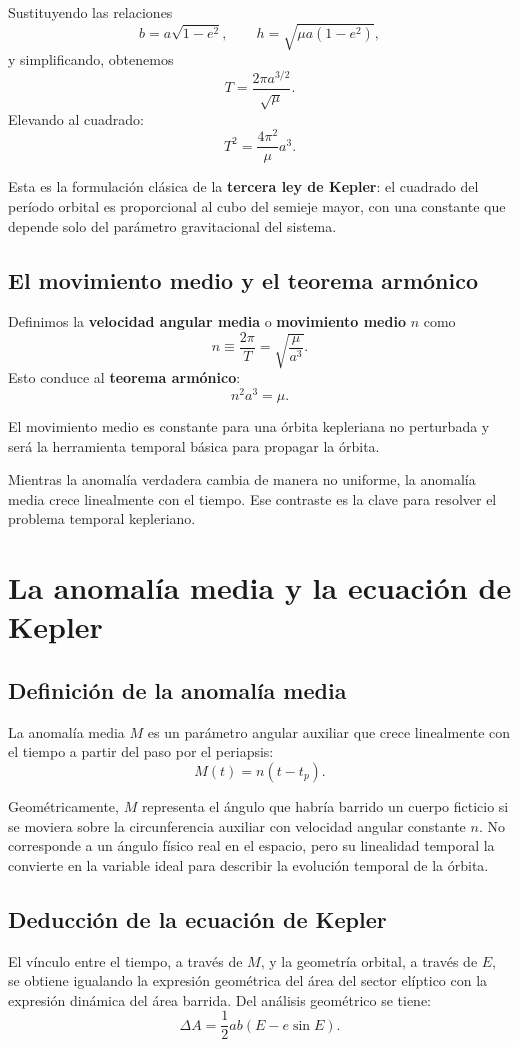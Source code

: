 Sustituyendo las relaciones
\[
 b = a\sqrt{1-e^2},
 \qquad
 h = \sqrt{\mu a(1-e^2)},
\]
y simplificando, obtenemos
\[
 T = \frac{2\pi a^{3/2}}{\sqrt{\mu}}.
\]
Elevando al cuadrado:
\[
 T^2 = \frac{4\pi^2}{\mu}a^3.
\]

Esta es la formulación clásica de la \textbf{tercera ley de Kepler}: el cuadrado del período orbital es proporcional al cubo del semieje mayor, con una constante que depende solo del parámetro gravitacional del sistema.

\subsection{El movimiento medio y el teorema armónico}
Definimos la \textbf{velocidad angular media} o \textbf{movimiento medio} \(n\) como
\[
 n \equiv \frac{2\pi}{T} = \sqrt{\frac{\mu}{a^3}}.
\]
Esto conduce al \textbf{teorema armónico}:
\[
 n^2 a^3 = \mu.
\]

El movimiento medio es constante para una órbita kepleriana no perturbada y será la herramienta temporal básica para propagar la órbita.

\begin{importante}
Mientras la anomalía verdadera cambia de manera no uniforme, la anomalía media crece linealmente con el tiempo. Ese contraste es la clave para resolver el problema temporal kepleriano.
\end{importante}

\section{La anomalía media y la ecuación de Kepler}
\subsection{Definición de la anomalía media}
La anomalía media \(M\) es un parámetro angular auxiliar que crece linealmente con el tiempo a partir del paso por el periapsis:
\[
 M(t) = n(t-t_p).
\]

Geométricamente, \(M\) representa el ángulo que habría barrido un cuerpo ficticio si se moviera sobre la circunferencia auxiliar con velocidad angular constante \(n\). No corresponde a un ángulo físico real en el espacio, pero su linealidad temporal la convierte en la variable ideal para describir la evolución temporal de la órbita.

\subsection{Deducción de la ecuación de Kepler}
El vínculo entre el tiempo, a través de \(M\), y la geometría orbital, a través de \(E\), se obtiene igualando la expresión geométrica del área del sector elíptico con la expresión dinámica del área barrida. Del análisis geométrico se tiene:
\[
 \Delta A = \frac{1}{2}ab(E-e\sin E).
\]

